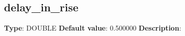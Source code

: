 \subsection*{delay_in_rise}
\textbf{Type}: DOUBLE\newline
\textbf{Default value}: 0.500000\newline
\textbf{Description}:
